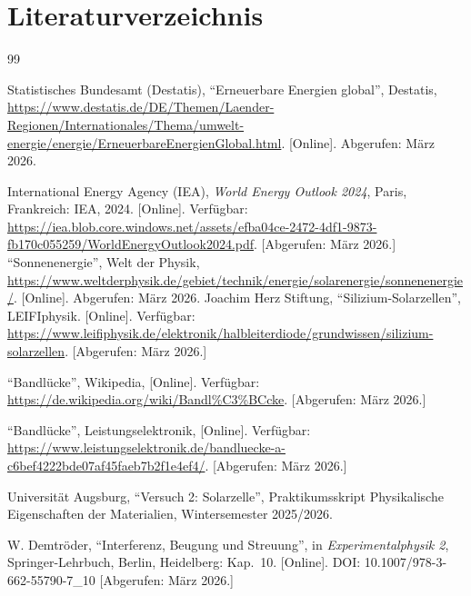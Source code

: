 \documentclass[11pt,a4paper]{article}
\numberwithin{equation}{section}
\begin{document}
\section{Literaturverzeichnis}



\begin{thebibliography}{99}





Statistisches Bundesamt (Destatis), ``Erneuerbare Energien global'', Destatis, \url{https://www.destatis.de/DE/Themen/Laender-Regionen/Internationales/Thema/umwelt-energie/energie/ErneuerbareEnergienGlobal.html}. [Online]. Abgerufen: März 2026.

International Energy Agency (IEA), \emph{World Energy Outlook 2024}, Paris, Frankreich: IEA, 2024. [Online]. Verfügbar: \url{https://iea.blob.core.windows.net/assets/efba04ce-2472-4df1-9873-fb170c055259/WorldEnergyOutlook2024.pdf}. [Abgerufen: März 2026.]
``Sonnenenergie'', Welt der Physik, \url{https://www.weltderphysik.de/gebiet/technik/energie/solarenergie/sonnenenergie/}. [Online]. Abgerufen: März 2026.
Joachim Herz Stiftung, ``Silizium-Solarzellen'', LEIFIphysik. [Online]. Verfügbar: \url{https://www.leifiphysik.de/elektronik/halbleiterdiode/grundwissen/silizium-solarzellen}. [Abgerufen: März 2026.]


``Bandlücke'', Wikipedia, [Online]. Verfügbar: \url{https://de.wikipedia.org/wiki/Bandl\%C3\%BCcke}. [Abgerufen: März 2026.]


``Bandlücke'', Leistungselektronik, [Online]. Verfügbar: \url{https://www.leistungselektronik.de/bandluecke-a-c6bef4222bde07af45faeb7b2f1e4ef4/}. [Abgerufen: März 2026.]

Universität Augsburg, ``Versuch 2: Solarzelle'', Praktikumsskript Physikalische Eigenschaften der Materialien, Wintersemester 2025/2026.

W. Demtröder, ``Interferenz, Beugung und Streuung'', in \emph{Experimentalphysik 2}, Springer-Lehrbuch, Berlin, Heidelberg: Kap.~10. [Online]. DOI: 10.1007/978-3-662-55790-7\_10 [Abgerufen: März 2026.]


\end{thebibliography}
\end{document}
